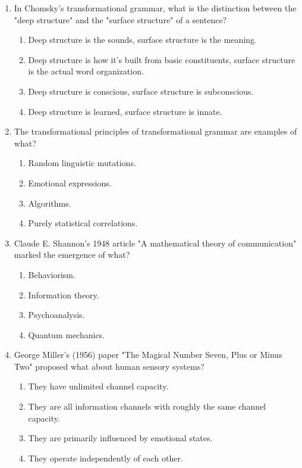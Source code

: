\documentclass{article}
\begin{document}
\begin{enumerate}[label=\arabic*.]
\item In Chomsky's transformational grammar, what is the distinction between the "deep structure" and the "surface structure" of a sentence?
\begin{enumerate}[label=(\alph*)]
    \item Deep structure is the sounds, surface structure is the meaning.
    \item Deep structure is how it's built from basic constituents, surface structure is the actual word organization.
    \item Deep structure is conscious, surface structure is subconscious.
    \item Deep structure is learned, surface structure is innate.
\end{enumerate}

\item The transformational principles of transformational grammar are examples of what?
\begin{enumerate}[label=(\alph*)]
    \item Random linguistic mutations.
    \item Emotional expressions.
    \item Algorithms.
    \item Purely statistical correlations.
\end{enumerate}

\item Claude E. Shannon's 1948 article "A mathematical theory of communication" marked the emergence of what?
\begin{enumerate}[label=(\alph*)]
    \item Behaviorism.
    \item Information theory.
    \item Psychoanalysis.
    \item Quantum mechanics.
\end{enumerate}

\item George Miller’s (1956) paper "The Magical Number Seven, Plus or Minus Two" proposed what about human sensory systems?
\begin{enumerate}[label=(\alph*)]
    \item They have unlimited channel capacity.
    \item They are all information channels with roughly the same channel capacity.
    \item They are primarily influenced by emotional states.
    \item They operate independently of each other.
\end{enumerate}


\end{enumerate}
\end{document}
